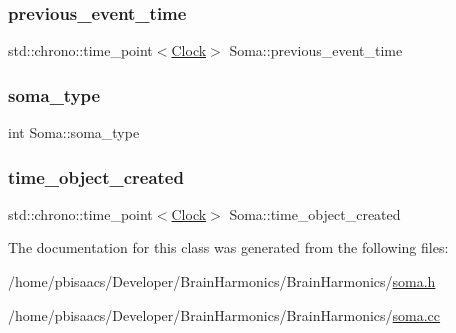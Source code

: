 \mbox{\label{classSoma_ab6204961b77d4224199eec0b105e41dd}} 
\subsubsection{\texorpdfstring{previous\+\_\+event\+\_\+time}{previous\_event\_time}}
{\footnotesize\ttfamily std\+::chrono\+::time\+\_\+point$<$\mbox{\hyperlink{universe_8h_a0ef8d951d1ca5ab3cfaf7ab4c7a6fd80}{Clock}}$>$ Soma\+::previous\+\_\+event\+\_\+time\hspace{0.3cm}{\ttfamily [private]}}

\mbox{\label{classSoma_ada423d58bc25a27df2a68adffb13718b}} 
\subsubsection{\texorpdfstring{soma\+\_\+type}{soma\_type}}
{\footnotesize\ttfamily int Soma\+::soma\+\_\+type\hspace{0.3cm}{\ttfamily [private]}}

\mbox{\label{classSoma_ac0e5b4b952e136b8a6c4c69f607ce4da}} 
\subsubsection{\texorpdfstring{time\+\_\+object\+\_\+created}{time\_object\_created}}
{\footnotesize\ttfamily std\+::chrono\+::time\+\_\+point$<$\mbox{\hyperlink{universe_8h_a0ef8d951d1ca5ab3cfaf7ab4c7a6fd80}{Clock}}$>$ Soma\+::time\+\_\+object\+\_\+created\hspace{0.3cm}{\ttfamily [private]}}



The documentation for this class was generated from the following files\+:\begin{DoxyCompactItemize}
\item 
/home/pbisaacs/\+Developer/\+Brain\+Harmonics/\+Brain\+Harmonics/\mbox{\hyperlink{soma_8h}{soma.\+h}}\item 
/home/pbisaacs/\+Developer/\+Brain\+Harmonics/\+Brain\+Harmonics/\mbox{\hyperlink{soma_8cc}{soma.\+cc}}\end{DoxyCompactItemize}
